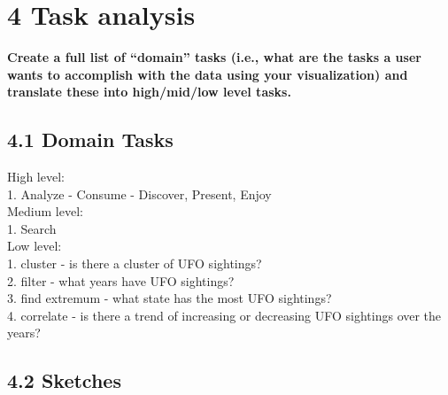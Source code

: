 \documentclass{neu_handout}
\begin{document}
\section*{4 Task analysis}

\textbf{Create a full list of “domain” tasks (i.e., what are the tasks a
user wants to accomplish with the data using your visualization) and translate these into high/mid/low level tasks.}

\subsection*{4.1 Domain Tasks}

High level: \\
1. Analyze - Consume - Discover, Present, Enjoy \\

Medium level: \\
1. Search \\

Low level:\\
1. cluster - is there a cluster of UFO sightings? \\
2. filter - what years have UFO sightings? \\
3. find extremum - what state has the most UFO sightings? \\
4. correlate - is there a trend of increasing or decreasing UFO sightings over the years? \\



\subsection*{4.2 Sketches}
\end{document}
